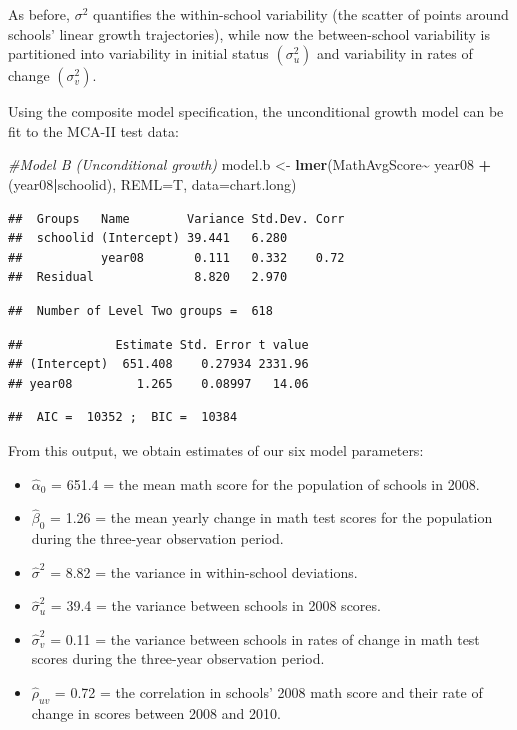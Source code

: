 \documentclass[
]{krantz}
\newenvironment{Shaded}{\begin{snugshade}}{\end{snugshade}}
\newcommand{\AttributeTok}[1]{\textcolor[rgb]{0.27,0.27,0.27}{#1}}
\newcommand{\CommentTok}[1]{\textcolor[rgb]{0.37,0.37,0.37}{\textit{#1}}}
\newcommand{\FunctionTok}[1]{\textcolor[rgb]{0.27,0.27,0.27}{\textbf{#1}}}
\newcommand{\NormalTok}[1]{#1}
\newcommand{\OtherTok}[1]{\textcolor[rgb]{0.37,0.37,0.37}{#1}}
\newcommand{\SpecialCharTok}[1]{\textcolor[rgb]{0.43,0.43,0.43}{\textbf{#1}}}
\providecommand{\tightlist}{%
  \setlength{\itemsep}{0pt}\setlength{\parskip}{0pt}}
\begin{document}
As before, \(\sigma^2\) quantifies the within-school variability (the scatter of points around schools' linear growth trajectories), while now the between-school variability is partitioned into variability in initial status \((\sigma^2_u)\) and variability in rates of change \((\sigma^2_v)\).

Using the composite model specification, the unconditional growth model can be fit to the MCA-II test data:

\begin{Shaded}
\begin{Highlighting}[]
\CommentTok{\#Model B (Unconditional growth)}
\NormalTok{model.b }\OtherTok{\textless{}{-}} \FunctionTok{lmer}\NormalTok{(MathAvgScore}\SpecialCharTok{\textasciitilde{}}\NormalTok{ year08 }\SpecialCharTok{+}\NormalTok{ (year08}\SpecialCharTok{|}\NormalTok{schoolid), }
  \AttributeTok{REML=}\NormalTok{T, }\AttributeTok{data=}\NormalTok{chart.long)}
\end{Highlighting}
\end{Shaded}

\begin{verbatim}
##  Groups   Name        Variance Std.Dev. Corr
##  schoolid (Intercept) 39.441   6.280        
##           year08       0.111   0.332    0.72
##  Residual              8.820   2.970
\end{verbatim}

\begin{verbatim}
##  Number of Level Two groups =  618
\end{verbatim}

\begin{verbatim}
##             Estimate Std. Error t value
## (Intercept)  651.408    0.27934 2331.96
## year08         1.265    0.08997   14.06
\end{verbatim}

\begin{verbatim}
##  AIC =  10352 ;  BIC =  10384
\end{verbatim}

From this output, we obtain estimates of our six model parameters:

\begin{itemize}
\tightlist
\item
  \(\hat{\alpha}_{0}\) = 651.4 = the mean math score for the population of schools in 2008.
\item
  \(\hat{\beta}_{0}\) = 1.26 = the mean yearly change in math test scores for the population during the three-year observation period.
\item
  \(\hat{\sigma}^2\) = 8.82 = the variance in within-school deviations.
\item
  \(\hat{\sigma}^2_u\) = 39.4 = the variance between schools in 2008 scores.
\item
  \(\hat{\sigma}^2_v\) = 0.11 = the variance between schools in rates of change in math test scores during the three-year observation period.
\item
  \(\hat{\rho}_{uv}\) = 0.72 = the correlation in schools' 2008 math score and their rate of change in scores between 2008 and 2010.
\end{itemize}
\end{document}
